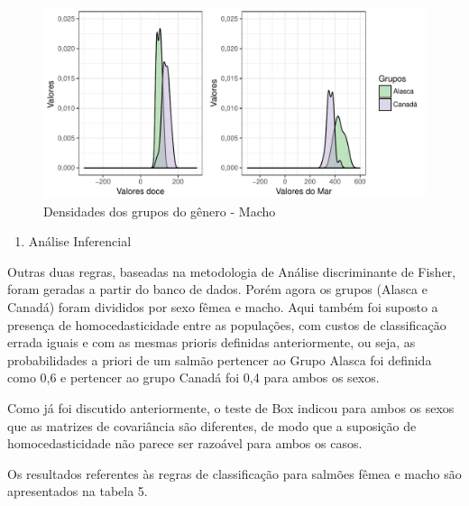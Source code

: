 \documentclass[10pt,portuguese,]{article}
\providecommand{\tightlist}{%
  \setlength{\itemsep}{0pt}\setlength{\parskip}{0pt}}
\begin{document}
\vspace{0.5cm}

\begin{figure}[!h]

{\centering \includegraphics{RELATORIO_FINAL_FORMATADO_files/figure-latex/unnamed-chunk-35-1} 

}

\caption{Densidades dos grupos do gênero -  Macho}\label{fig:unnamed-chunk-35}
\end{figure}

\vspace{0.5cm}

\newpage

\begin{enumerate}
\def\labelenumi{\arabic{enumi}.}
\setcounter{enumi}{4}
\tightlist
\item
  Análise Inferencial
\end{enumerate}

\vspace{0.5cm} Outras duas regras, baseadas na metodologia de Análise
discriminante de Fisher, foram geradas a partir do banco de dados. Porém
agora os grupos (Alasca e Canadá) foram divididos por sexo fêmea e
macho. Aqui também foi suposto a presença de homocedasticidade entre as
populações, com custos de classificação errada iguais e com as mesmas
prioris definidas anteriormente, ou seja, as probabilidades a priori de
um salmão pertencer ao Grupo Alasca foi definida como 0,6 e pertencer ao
grupo Canadá foi 0,4 para ambos os sexos.

Como já foi discutido anteriormente, o teste de Box indicou para ambos
os sexos que as matrizes de covariância são diferentes, de modo que a
suposição de homocedasticidade não parece ser razoável para ambos os
casos.

Os resultados referentes às regras de classificação para salmões fêmea e
macho são apresentados na tabela 5.
\end{document}
